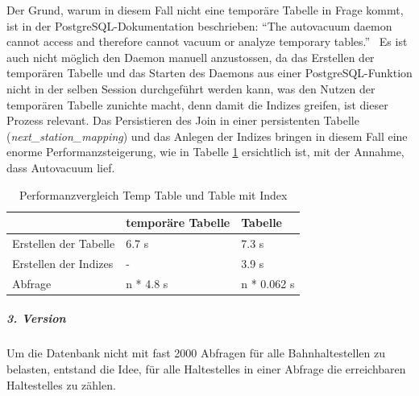 Der Grund, warum in diesem Fall nicht eine temporäre Tabelle in Frage kommt, ist in der PostgreSQL-Dokumentation beschrieben: "`The autovacuum daemon cannot access and therefore cannot vacuum or analyze temporary tables."'~\cite{postgresql_doc}
Es ist auch nicht möglich den Daemon manuell anzustossen, da das Erstellen der temporären Tabelle und das Starten des Daemons aus einer PostgreSQL-Funktion nicht in der selben Session durchgeführt werden kann, was den Nutzen der temporären Tabelle zunichte macht, denn damit die Indizes greifen, ist dieser Prozess relevant.
Das Persistieren des Join in einer persistenten Tabelle (\emph{next\_station\_mapping}) und das Anlegen der Indizes bringen in diesem Fall eine enorme Performanzsteigerung, wie in Tabelle \ref{table:Performanzvergleich Temp Table und Table mit Index} ersichtlich ist, mit der Annahme, dass Autovacuum lief.

\begin{table}[ht]
    \centering
    \begin{tabular}[ht]{l l l}
        \toprule
        \textbf{} 
                                & \textbf{temporäre Tabelle}
                                & \textbf{Tabelle}\\
        \midrule
        Erstellen der Tabelle
                                & 6.7 s
                                & 7.3 s\\
        Erstellen der Indizes
                                & -
                                & 3.9 s\\
        Abfrage
                                & n * 4.8 s
                                & n * 0.062 s\\        
        \bottomrule
    \end{tabular}
    \caption{Performanzvergleich Temp Table und Table mit Index}
    \label{table:Performanzvergleich Temp Table und Table mit Index}
\end{table}

\subparagraph{3. Version}
Um die Datenbank nicht mit fast 2000 Abfragen für alle Bahnhaltestellen zu belasten, entstand die Idee, für alle \glspl{Haltestelle} in einer Abfrage die erreichbaren \glspl{Haltestelle} zu zählen.

\begin{listing}[ht]
    \inputminted{sql}{projectdoc/listing/count_of_distinct_next_stops_v3.sql}
    \caption{SQL-Query zur Bestimmung der Anzahl erreichbaren \glspl{Haltestelle} (Version 3)}
    \label{listing:count_of_distinct_next_stops_v3}
\end{listing}

